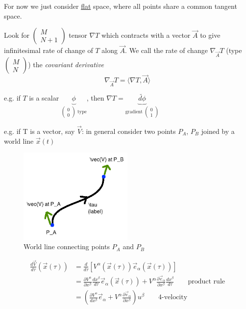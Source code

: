 \documentclass[a4paper]{article} %
\newcommand{\pmx}[1]{
\begin{pmatrix}
#1
\end{pmatrix}
}
\renewcommand{\tilde}{\widetilde}
\begin{document}
For now we just consider \underline{flat} space, where all points share a common tangent space.


Look for $\pmx{M\\N+1}$ tensor $\nabla T$ which contracts with a vector $\vec{A}$ to give infinitesimal rate of change of $T$ along $\vec{A}$. We call the rate of change $\nabla_{\vec{A}}T$ (type $\pmx{M\\N}$) the \emph{covariant derivative}
\begin{equation}
\nabla_{\vec{A}} T=\langle \nabla T,\vec{A}\rangle
\end{equation}

e.g. if $T$ is a scalar $\underbrace{\phi}_{\pmx{0\\0}\text{ type}}$, then $\nabla T=\underbrace{\tilde{d\phi}}_{\text{gradient }\pmx{0\\1}}$

e.g. if T is a vector, say $\vec{V}$: in general consider two points $P_A$, $P_B$ joined by a world line $\vec{x}(t)$

\begin{figure}[h]
\centering
\includegraphics[width=0.5\textwidth]{images/world-line.png}
\caption{World line connecting points $P_A$ and $P_B$}
\end{figure}

\begin{align*}
\frac{d\vec{V}}{d\tau}(\vec{x}(\tau))&=\frac{d}{d\tau}\left[V^{\alpha}(\vec{x}(\tau))\vec{e}_{\alpha}
(\vec{x}(\tau))\right]\\
&=\frac{\partial V^{\alpha}}{\partial x^{\beta}}\frac{dx^{\beta}}{d\tau}\vec{e}_{\alpha}(\vec{x}(\tau))
+V^{\alpha}\frac{\partial \vec{e}_{\alpha}}{\partial x^{\beta}}\frac{dx^{\beta}}{d\tau}\qquad\text{product rule}\\
&=\left(\frac{\partial V^{\alpha}}{dx^{\beta}}\vec{e}_{\alpha}+V^{\alpha}\frac{\partial \vec{e}_{\alpha}}{\partial x^{\beta}}\right)u^{\beta}\qquad\text{4-velocity}\label{diff eqn1}
\end{align*}
\end{document}
